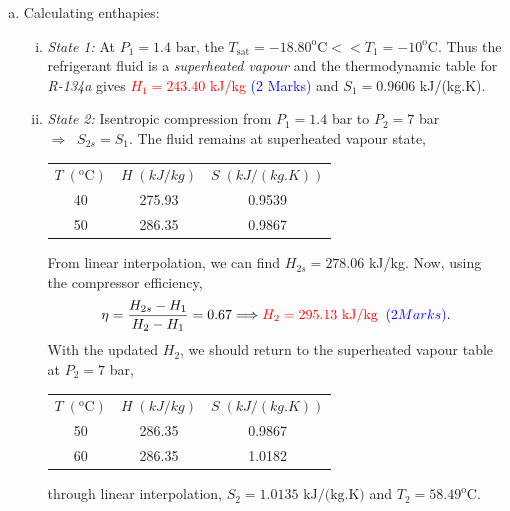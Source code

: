 \documentclass[12pt,twoside]{report}
\newcommand{\frc}{\displaystyle\frac}
\begin{document}
\begin{description}
\begin{enumerate}[(a)]
\item Calculating enthapies:
\begin{enumerate}[(i)]
\item {\it State 1:} At $P_{1}=1.4\text{ bar}$, the $T_{\text{sat}}=-18.80^{\text{o}}\text{C}<< T_{1}=-10^{\text{o}}$C. Thus the refrigerant fluid is a {\it superheated vapour} and the thermodynamic table for {\it R-134a} gives \textcolor{red}{$H_{1}=243.40$ kJ/kg} \textcolor{blue}{(2 Marks)} and $S_{1}=0.9606$ kJ/(kg.K).
\item {\it State 2:} Isentropic compression from $P_{1}=1.4$ bar to $P_{2}=7$ bar $\Longrightarrow\;\;S_{2s}=S_{1}$. The fluid remains at superheated vapour state, 
\begin{center}
\begin{tabular}{c c c}
$T\;\left(^{\text{o}}\text{C}\right)$ & $H\;\left(kJ/kg\right)$ & $S\;\left(kJ/(kg.K)\right)$ \\
40  & 275.93  & 0.9539 \\
50  & 286.35  & 0.9867 
\end{tabular}
\end{center}
From linear interpolation, we can find $H_{2s}=278.06$ kJ/kg. Now, using the compressor efficiency,
\begin{displaymath}
\eta=\frc{H_{2s}-H_{1}}{H_{2}-H_{1}}=0.67 \Longrightarrow \textcolor{red}{H_{2}=295.13 \text{ kJ/kg}}\;\;\textcolor{blue}{\text(2 Marks)}.%
\end{displaymath} 
With the updated $H_{2}$, we should return to the superheated vapour table at $P_{2}=7$ bar,
\begin{center}
\begin{tabular}{c c c}
$T\;\left(^{\text{o}}\text{C}\right)$ & $H\;\left(kJ/kg\right)$ & $S\;\left(kJ/(kg.K)\right)$ \\
50  & 286.35  & 0.9867 \\
60  & 286.35  & 1.0182 
\end{tabular}
\end{center}
through linear interpolation, $S_{2} =1.0135 \text{ kJ/(kg.K)}$ and $T_{2}=58.49^{\text{o}}$C.


\end{enumerate}
\end{enumerate}
\end{description}
\end{document}
